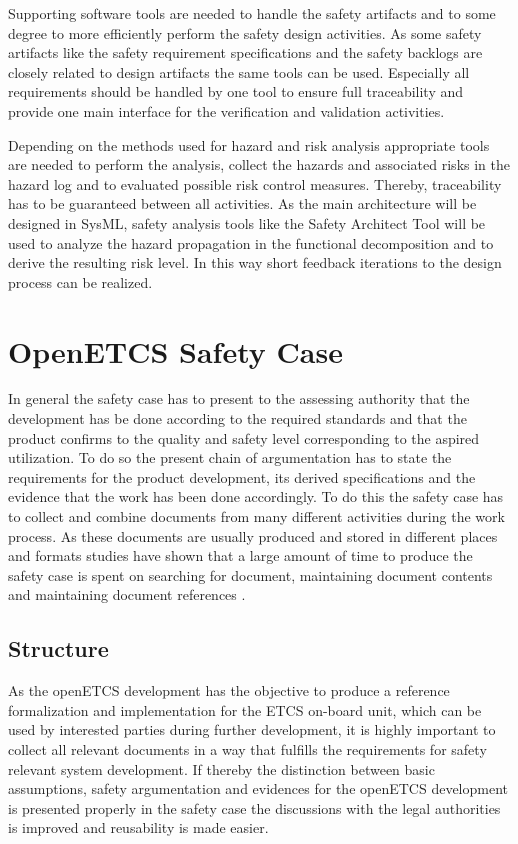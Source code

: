 \documentclass{template/openetcs_report}
\begin{document}
Supporting software tools are needed to handle the safety artifacts and to some degree to more efficiently perform the safety design activities. As some safety artifacts like the safety requirement specifications and the safety backlogs are closely related to design artifacts the same tools can be used. Especially all requirements should be handled by one tool to ensure full traceability and provide one main interface for the verification and validation activities.

Depending on the methods used for hazard and risk analysis appropriate tools are needed to perform the analysis, collect the hazards and associated risks in the hazard log and to evaluated possible risk control measures. Thereby, traceability has to be guaranteed between all activities. As the main architecture will be designed in SysML, safety analysis tools like the Safety Architect Tool will be used to analyze the hazard propagation in the functional decomposition and to derive the resulting risk level. In this way short feedback iterations to the design process can be realized.

\chapter{OpenETCS Safety Case}
\label{sec:safetycase}

In general the safety case has to present to the assessing authority that the development has be done according to the required standards and that the product confirms to the quality and safety level corresponding to the aspired utilization. 
To do so the present chain of argumentation has to state the requirements for the product development, its derived specifications and the evidence that the work has been done accordingly. To do this the safety case has to collect and combine documents from many different activities during the work process. As these documents are usually produced and stored in different places and formats studies have shown that a large amount of time to produce the safety case is spent on searching for document, maintaining document contents and maintaining document references \cite{Muller.2010}. 

\section{Structure}
\label{sec:safetycase-structure}
As the openETCS development has the objective to produce a reference formalization and implementation for the ETCS on-board unit, which can be used by interested parties during further development, it is highly important to collect all relevant documents in a way that fulfills the requirements for safety relevant system development. If thereby the distinction between basic assumptions, safety argumentation and evidences for the openETCS development is presented properly in the safety case the discussions with the legal authorities is improved and reusability is made easier. 
\end{document}
